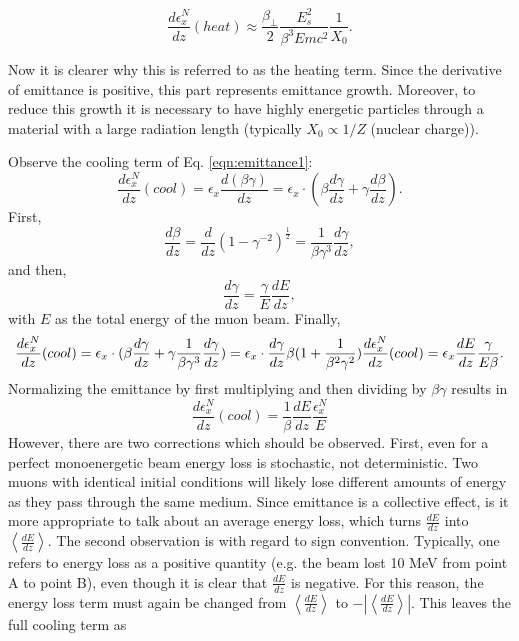 \begin{equation}
\label{eqn:emittanceheat}
\frac{d\epsilon_x^N}{dz}(heat)\approx\frac{\beta_\perp}{2}\frac{E_s^2}{\beta^3Emc^2}\frac{1}{X_0}.
\end{equation}

Now it is clearer why this is referred to as the heating term. Since the derivative of emittance is positive, this part represents emittance growth. Moreover, to reduce this growth it is necessary to have highly energetic particles through a material with a large radiation length (typically $X_0 \propto 1/Z$ (nuclear charge)).

Observe the cooling term of Eq. \eqref{eqn:emittance1}:
\begin{equation} \nonumber
\frac{d\epsilon_x^N}{dz}(cool)=\epsilon_x\frac{d(\beta\gamma)}{dz}=\epsilon_x\cdot(\beta\frac{d\gamma}{dz}+\gamma\frac{d\beta}{dz}).
\end{equation}
First,
\begin{equation} \nonumber
\frac{d\beta}{dz}=\frac{d}{dz}(1-\gamma^{-2})^{\frac{1}{2}}=\frac{1}{\beta\gamma^3}\frac{d\gamma}{dz},
\end{equation}
and then,
\begin{equation} \nonumber
\frac{d\gamma}{dz}=\frac{\gamma}{E}\frac{dE}{dz},
\end{equation}
with $E$ as the total energy of the muon beam. Finally,
\begin{equation} \nonumber
\frac{d\epsilon_x^N}{dz}(cool)=\epsilon_x\cdot(\beta\frac{d\gamma}{dz}+\gamma\frac{1}{\beta\gamma^3}\frac{d\gamma}{dz})=\epsilon_x\cdot\frac{d\gamma}{dz}\beta(1+\frac{1}{\beta^2\gamma^2}) \vspace*{12pt}
\frac{d\epsilon_x^N}{dz}(cool)=\epsilon_x\frac{dE}{dz}\frac{\gamma}{E\beta}.
\end{equation}
Normalizing the emittance by first multiplying and then dividing by $\beta\gamma$ results in
\begin{equation} \nonumber
\frac{d\epsilon_x^N}{dz}(cool)=\frac{1}{\beta}\frac{dE}{dz}\frac{\epsilon_x^N}{E}
\end{equation}
However, there are two corrections which should be observed. First, even for a perfect monoenergetic beam energy loss is stochastic, not deterministic. Two muons with identical initial conditions will likely lose different amounts of energy as they pass through the same medium. Since emittance is a collective effect, is it more appropriate to talk about an average energy loss, which turns $\frac{dE}{dz}$ into $\left<\frac{dE}{dz}\right>$. The second observation is with regard to sign convention. Typically, one refers to energy loss as a positive quantity (e.g. the beam lost 10 MeV from point A to point B), even though it is clear that $\frac{dE}{dz}$ is negative. For this reason, the energy loss term must again be changed from $\left<\frac{dE}{dz}\right>$ to  $-\left|\left<\frac{dE}{dz}\right>\right|$. This leaves the full cooling term as






